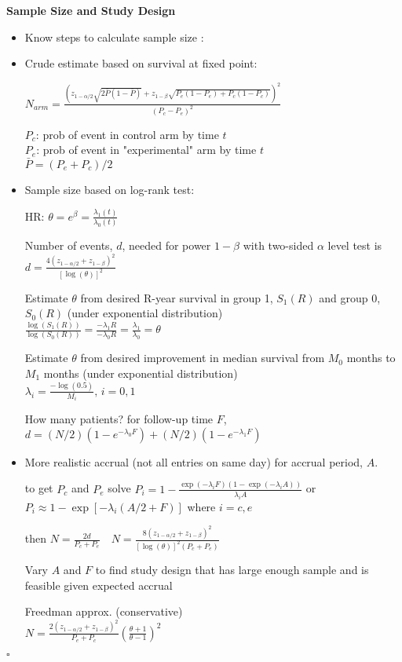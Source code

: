 \documentclass[11pt]{article}
\begin{document}
\textbf{Sample Size and Study Design} 

\begin{itemize}
	\item Know steps to calculate sample size :
	
\item Crude estimate based on survival at fixed point:

$N_{arm}=\frac{\left(z_{1-\alpha/2}\sqrt{2\bar{P}(1-\bar{P})} +z_{1-\beta}\sqrt{P_e(1-P_e) + P_c(1-P_c)} \right)^2}{(P_c-P_e)^2}$

$P_c$: prob of event in control arm by time $t$\\
$P_e$: prob of event in "experimental" arm by time $t$\\
$\bar{P}=(P_e + P_c)/2$

\item Sample size based on log-rank test:

HR: $\theta=e^{\beta}=\frac{\lambda_1(t)}{\lambda_0(t)}$

Number of events, $d$, needed for power $1-\beta$ with two-sided $\alpha$ level test is $d=\frac{4(z_{1-\alpha/2}+z_{1-\beta})^2}{[\log(\theta)]^2}$

Estimate $\theta$ from desired R-year survival in group 1, $S_{1}(R)$ and group 0, $S_{0}(R)$ (under exponential distribution)\\
$\frac{\log(S_{1}(R))}{\log(S_{0}(R))}=\frac{-\lambda_1 R}{-\lambda_0 R}=\frac{\lambda_1}{\lambda_0}=\theta$

Estimate $\theta$ from desired improvement in median survival from $M_0$ months to $M_1$ months  (under exponential distribution)\\
$\lambda_{i}=\frac{-\log(0.5)}{M_{i}},\, i=0,1$ 

How many patients? for follow-up time $F$,\\
$d=(N/2)(1-e^{-\lambda_0 F}) + (N/2)(1-e^{-\lambda_1 F})$

\item More realistic accrual (not all entries on same day) for accrual period, $A$.

to get $P_c$ and $P_e$ solve $P_i=1-\frac{\exp(-\lambda_i F)(1-\exp(-\lambda_i A))}{\lambda_i A}$
or
$P_i \approx 1- \exp[-\lambda_i(A/2 + F)]$ where $i=c,e$

then
$N = \frac{2d}{P_c + P_e} \quad N=\frac{8(z_{1-\alpha/2}+z_{1-\beta})^2}{[\log(\theta)]^2(P_c+P_e)}$

Vary $A$ and $F$ to find study design that has large enough sample and is feasible given expected accrual

Freedman approx. (conservative)\\
$N=\frac{2(z_{1-\alpha/2} + z_{1-\beta})^2}{P_e + P_c}\left(\frac{\theta + 1}{\theta -1}\right)^2$

\end{itemize}







$\square$
\end{document}
